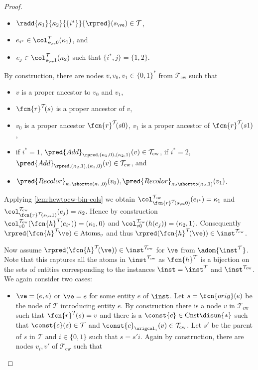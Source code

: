 \begin{proof}
\begin{itemize}
		\begin{itemize}
			\item $\radd{\kappa_1}{\kappa_2}{\{ i^* \}}{\rpred}(s_{\ve})\in\mathcal{T}$,
			\item $e_{i^{*}} \in\col_{s_{\ve}0}^{\mathcal{T}}(\kappa_1)$, and
			\item $e_{j}\in\col_{s_{\ve}1}^{\mathcal{T}}(\kappa_2)$ such that $\{ i^*, j \} = \{ 1,2 \}$.
		\end{itemize}
		By construction, there are nodes $v, v_0, v_1\in\{ 0,1 \}^{\ast}$ from $\mathcal{T}_{\mathrm{cw}}$ such that
		\begin{itemize}
			\item $v$ is a proper ancestor to $v_0$ and $v_1$,
			\item $\fcn{r}^{\mathcal{T}}\!(s)$ is a proper ancestor of $v$,
			\item $v_0$ is a proper ancestor $\fcn{r}^{\mathcal{T}}\!(s0)$, $v_1$ is a proper ancestor of $\fcn{r}^{\mathcal{T}}\!(s1)$,
			\item if $i^* = 1$, $\pred{Add}_{\rpred, (\kappa_{1}, 0), (\kappa_{2}, 1)}(v)\in\mathcal{T}_{\mathrm{cw}}$, if $i^* = 2$, $\pred{Add}_{\rpred, (\kappa_{2}, 1), (\kappa_{1}, 0)}(v)\in\mathcal{T}_{\mathrm{cw}}$, and
			\item $\pred{Recolor}_{\kappa_1\shortto (\kappa_1, 0)}(v_0), \pred{Recolor}_{\kappa_2\shortto (\kappa_2, 1)}(v_1)$.
		\end{itemize}
		Applying \cref{lem:hcwtocw-bin-cols} we obtain $ \col_{\fcn{r}^{\mathcal{T}}\!(s_{\ve}0)}^{\mathcal{T}_{\mathrm{cw}}}(e_{i^{\ast}}) = \kappa_1$ and $\col_{\fcn{r}^{\mathcal{T}}\!(s_{\ve}1)}^{\mathcal{T}_{\mathrm{cw}}}(e_{j}) = \kappa_2$. Hence by construction $ \col_{v0}^{\mathcal{T}_{\mathrm{cw}}}(\fcn{h}^{\mathcal{T}}\!(e_{i^{\ast}})) = (\kappa_1, 0)$ and $\col_{v0}^{\mathcal{T}_{\mathrm{cw}}}(h(e_{j})) = (\kappa_2, 1)$. Consequently $\rpred(\fcn{h}^{\mathcal{T}}\!\ve)\in\mathrm{Atoms}_{v}$ and thus $\rpred(\fcn{h}^{\mathcal{T}}\!(\ve))\in\inst^{\mathcal{T}_{\mathrm{cw}}}$.
	\end{itemize}
	Now assume $\rpred(\fcn{h}^{\mathcal{T}}\!(\ve))\in\inst^{\mathcal{T}_{\mathrm{cw}}}$ for $\ve$ from $\adom{\inst^{\mathcal{T}}}$. Note that this captures all the atoms in $\inst^{\mathcal{T}_{\mathrm{cw}}}$ as $\fcn{h}^{\mathcal{T}}$ is a bijection on the sets of entities corresponding to the instances $\inst = \inst^{\mathcal{T}}$ and $\inst^{\mathcal{T}_{\mathrm{cw}}}$. We again consider two cases:
	\begin{itemize}
		\item $\ve = (e, e)$ or $\ve = e$ for some entity $e$ of $\inst$. Let $s = \fcn{orig}(e)$ be the node of $\mathcal{T}$ introducing entity $e$. By construction there is a node $v$ in $\mathcal{T}_{\mathrm{cw}}$ such that $\fcn{r}^{\mathcal{T}}\!(s) = v$ and there is a $\const{c}\in\mathrm{Cnst} {\disun} \{ \ast \}$ such that $\const{c}(s)\in\mathcal{T}$ and $\const{c}_{\origcol_1}(v)\in\mathcal{T}_{\mathrm{cw}}$. Let $s'$ be the parent of $s$ in $\mathcal{T}$ and $i\in\{ 0,1 \}$ such that $s = s'i$. Again by construction, there are nodes $v_{i}, v'$ of $\mathcal{T}_{\mathrm{cw}}$ such that

\end{itemize}
\end{proof}

